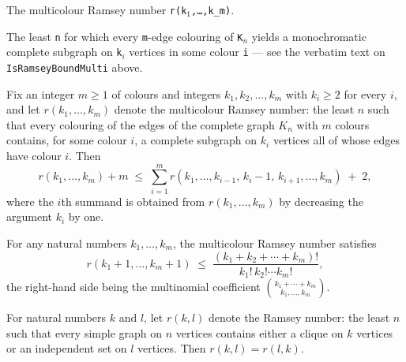 \begin{definition}
\label{SimpleGraph.ramseyNumberMulti}
\leanok
{}
The multicolour Ramsey number \texttt{r(k$_{1}$,\dots{},k\_m)}.

The least \texttt{n} for which every \texttt{m}-edge colouring of \texttt{K$_{n}$}
yields a monochromatic
complete subgraph on \texttt{k$_{i}$} vertices in some colour \texttt{i} --- see the
verbatim text on
\texttt{IsRamseyBoundMulti} above.
\end{definition}

\begin{theorem}
\label{SimpleGraph.ramseyMulti_recursion}
Fix an integer $m \ge 1$ of colours and integers $k_1, k_2, \dots, k_m$ with $k_i \ge 2$
for every $i$, and let $r(k_1, \dots, k_m)$ denote the multicolour Ramsey number: the
least $n$ such that every colouring of the edges of the complete graph $K_n$ with $m$
colours contains, for some colour $i$, a complete subgraph on $k_i$ vertices all of
whose edges have colour $i$. Then
\[
r(k_1, \dots, k_m) + m \;\le\; \sum_{i=1}^{m} r(k_1, \dots, k_{i-1}, \, k_i - 1, \,
k_{i+1}, \dots, k_m) \;+\; 2,
\]
where the $i$th summand is obtained from $r(k_1, \dots, k_m)$ by decreasing the argument
$k_i$ by one.
\end{theorem}

\begin{theorem}
\label{SimpleGraph.ramseyMulti_le_multinomial}
For any natural numbers $k_1, \ldots, k_m$, the multicolour Ramsey number satisfies
\[
r(k_1 + 1, \ldots, k_m + 1) \;\le\; \frac{(k_1 + k_2 + \cdots + k_m)!}{k_1!\, k_2!
\cdots k_m!},
\]
the right-hand side being the multinomial coefficient $\binom{k_1 + \cdots + k_m}{k_1,
\ldots, k_m}$.
\end{theorem}

\begin{theorem}
\label{SimpleGraph.ramseyNumber_comm}
For natural numbers $k$ and $l$, let $r(k,l)$ denote the Ramsey number: the least $n$
such that every simple graph on $n$ vertices contains either a clique on $k$ vertices or
an independent set on $l$ vertices. Then $r(k,l) = r(l,k)$.
\end{theorem}

